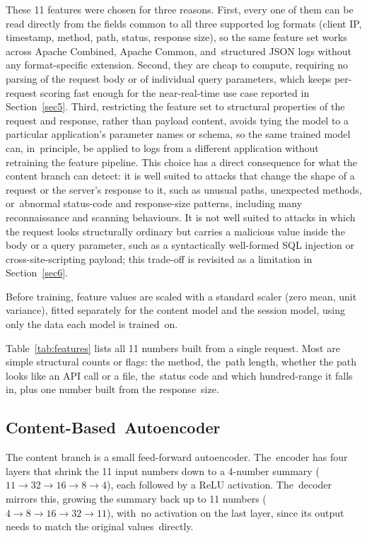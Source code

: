 \documentclass[futureinternet,article,accept,moreauthors]{Definitions/mdpi}
\begin{document}
These 11 features were chosen for three reasons. First, every one of them can be read directly from the fields common to all three supported log formats (client IP, timestamp, method, path, status, response size), so the same feature set works across Apache Combined, Apache Common, and~structured JSON logs without any format-specific extension. Second, they are cheap to compute, requiring no parsing of the request body or of individual query parameters, which keeps per-request scoring fast enough for the near-real-time use case reported in Section~\ref{sec5}. Third, restricting the feature set to structural properties of the request and response, rather than payload content, avoids tying the model to a particular application's parameter names or schema, so the same trained model can, in~principle, be applied to logs from a different application without retraining the feature pipeline. This choice has a direct consequence for what the content branch can detect: it is well suited to attacks that change the shape of a request or the server's response to it, such as unusual paths, unexpected methods, or~abnormal status-code and response-size patterns, including many reconnaissance and scanning behaviours. It is not well suited to attacks in which the request looks structurally ordinary but carries a malicious value inside the body or a query parameter, such as a syntactically well-formed SQL injection or cross-site-scripting payload; this trade-off is revisited as a limitation in Section~\ref{sec6}.

Before training, feature values are scaled with a standard scaler (zero mean, unit variance), fitted separately for the content model and the session model, using only the data each model is trained~on.



Table~\ref{tab:features} lists all 11 numbers built from a single request. Most are simple structural counts or flags: the method, the~path length, whether the path looks like an API call or a file, the~status code and which hundred-range it falls in, plus one number built from the response~size.

\subsection{Content-Based~Autoencoder} \label{sec4.4}

The content branch is a small feed-forward autoencoder. The~encoder has four layers that shrink the 11 input numbers down to a 4-number summary ($11 \rightarrow 32 \rightarrow 16 \rightarrow 8 \rightarrow 4$), each followed by a ReLU activation. The~decoder mirrors this, growing the summary back up to 11 numbers ($4 \rightarrow 8 \rightarrow 16 \rightarrow 32 \rightarrow 11$), with~no activation on the last layer, since its output needs to match the original values~directly.
\end{document}
